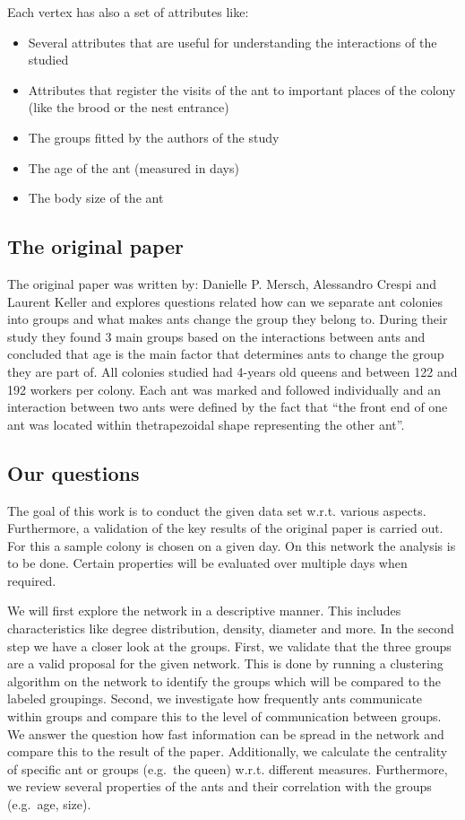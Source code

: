 \documentclass[
]{article}
\begin{document}
Each vertex has also a set of attributes like:

\begin{itemize}
\item
  Several attributes that are useful for understanding the interactions
  of the studied
\item
  Attributes that register the visits of the ant to important places of
  the colony (like the brood or the nest entrance)
\item
  The groups fitted by the authors of the study
\item
  The age of the ant (measured in days)
\item
  The body size of the ant
\end{itemize}

\hypertarget{the-original-paper}{%
\subsection{The original paper}\label{the-original-paper}}

The original paper was written by: Danielle P. Mersch, Alessandro Crespi
and Laurent Keller and explores questions related how can we separate
ant colonies into groups and what makes ants change the group they
belong to. During their study they found 3 main groups based on the
interactions between ants and concluded that age is the main factor that
determines ants to change the group they are part of. All colonies
studied had 4-years old queens and between 122 and 192 workers per
colony. Each ant was marked and followed individually and an interaction
between two ants were defined by the fact that ``the front end of one
ant was located within thetrapezoidal shape representing the other
ant''.

\hypertarget{our-questions}{%
\subsection{Our questions}\label{our-questions}}

The goal of this work is to conduct the given data set w.r.t. various
aspects. Furthermore, a validation of the key results of the original
paper is carried out. For this a sample colony is chosen on a given day.
On this network the analysis is to be done. Certain properties will be
evaluated over multiple days when required.

We will first explore the network in a descriptive manner. This includes
characteristics like degree distribution, density, diameter and more. In
the second step we have a closer look at the groups. First, we validate
that the three groups are a valid proposal for the given network. This
is done by running a clustering algorithm on the network to identify the
groups which will be compared to the labeled groupings. Second, we
investigate how frequently ants communicate within groups and compare
this to the level of communication between groups. We answer the
question how fast information can be spread in the network and compare
this to the result of the paper. Additionally, we calculate the
centrality of specific ant or groups (e.g.~the queen) w.r.t. different
measures. Furthermore, we review several properties of the ants and
their correlation with the groups (e.g.~age, size).
\end{document}
